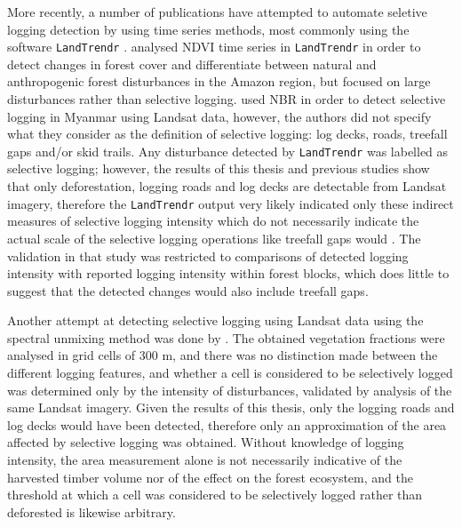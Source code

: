 \documentclass[a4paper,12pt]{scrbook}
\begin{document}
More recently, a number of publications have attempted to automate seletive logging detection by using time series methods, most commonly using the software \texttt{LandTrendr} \citep{kennedy_detecting_2010}. \citet{fragal_reconstructing_2016} analysed \ac{NDVI} time series in \texttt{LandTrendr} in order to detect changes in forest cover and differentiate between natural and anthropogenic forest disturbances in the Amazon region, but focused on large disturbances rather than selective logging. \citet{shimizu_using_2017} used \ac{NBR} in order to detect selective logging in Myanmar using Landsat data, however, the authors did not specify what they consider as the definition of selective logging: log decks, roads, treefall gaps and/or skid trails. Any disturbance detected by \texttt{LandTrendr} was labelled as selective logging; however, the results of this thesis and previous studies show that only deforestation, logging roads and log decks are detectable from Landsat imagery, therefore the \texttt{LandTrendr} output very likely indicated only these indirect measures of selective logging intensity which do not necessarily indicate the actual scale of the selective logging operations like treefall gaps would \citep{frolking_forest_2009}. The validation in that study was restricted to comparisons of detected logging intensity with reported logging intensity within forest blocks, which does little to suggest that the detected changes would also include treefall gaps.

Another attempt at detecting selective logging using Landsat data using the spectral unmixing method was done by \citet{grecchi_integrated_2017}. The obtained vegetation fractions were analysed in grid cells of 300 m, and there was no distinction made between the different logging features, and whether a cell is considered to be selectively logged was determined only by the intensity of disturbances, validated by analysis of the same Landsat imagery. Given the results of this thesis, only the logging roads and log decks would have been detected, therefore only an approximation of the area affected by selective logging was obtained. Without knowledge of logging intensity, the area measurement alone is not necessarily indicative of the harvested timber volume nor of the effect on the forest ecosystem, and the threshold at which a cell was considered to be selectively logged rather than deforested is likewise arbitrary.
\end{document}
